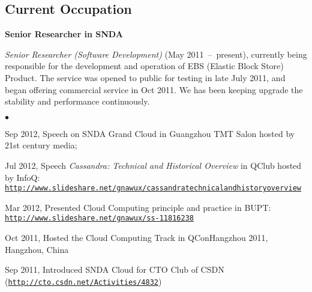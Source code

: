 \documentclass[a4paper,margin,line]{res}
\newenvironment{list1}{
  \begin{list}{\ding{113}}{%
      \setlength{\itemsep}{0in}
      \setlength{\parsep}{0in} \setlength{\parskip}{0in}
      \setlength{\topsep}{0in} \setlength{\partopsep}{0in} 
      \setlength{\leftmargin}{0.17in}}}{\end{list}}
\newenvironment{list2}{
  \begin{list}{$\bullet$}{%
      \setlength{\itemsep}{0in}
      \setlength{\parsep}{0in} \setlength{\parskip}{0in}
      \setlength{\topsep}{0in} \setlength{\partopsep}{0in} 
      \setlength{\leftmargin}{0.2in}}}{\end{list}}
\newcommand{\http}{http:/\hspace{-0.3ex}/}
\newcommand{\hindent}{\mbox{\hspace{8ex}}}
\begin{document}
\begin{resume}
\section{\sc Current Occupation}
\textbf{Senior Researcher in SNDA}\\
\vspace*{-.1in}
\begin{list1}
\item[] \emph{Senior Researcher (Software Development)}\/ (May 2011~--~present), currently being responsible for the development and operation of EBS (Elastic Block Store) Product. The service was opened to public for testing in late July 2011, and began offering commercial service in Oct 2011. We has been keeping upgrade the stability and performance continuously.  
\begin{list2}
\vspace*{.05in}
\item Sep 2012, Speech on SNDA Grand Cloud in Guangzhou TMT Salon hosted by 21st century media;
\item Jul 2012, Speech \textit{Cassandra: Technical and Historical Overview}\/ in QClub hosted by InfoQ:\\ \hindent\href{http://www.slideshare.net/gnawux/cassandratechnicalandhistoryoverview}{\tt\http{}www.slideshare.net/gnawux/cassandratechnicalandhistoryoverview}
\item Mar 2012, Presented Cloud Computing principle and practice in BUPT: \\ \hindent\href{http://www.slideshare.net/gnawux/ss-11816238}{\tt\http{}www.slideshare.net/gnawux/ss-11816238}
\item Oct 2011, Hosted the Cloud Computing Track in QConHangzhou 2011, Hangzhou, China
\item Sep 2011, Introduced SNDA Cloud for CTO Club of CSDN \\(\href{http://cto.csdn.net/Activities/4832}{\tt\http{}cto.csdn.net/Activities/4832})
\end{list2}
\end{list1}


\end{resume}
\end{document}
